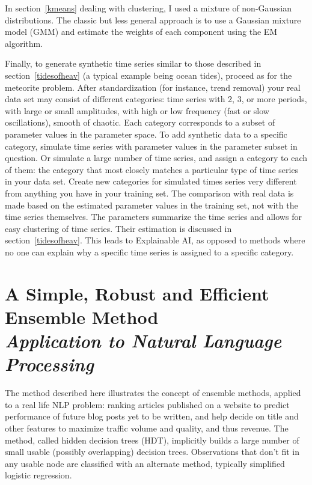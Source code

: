 \documentclass[oneside,10pt]{book}
\newcommand\Chapter[2]{
  \chapter[#1]{#1\\[2ex]\Large\itshape#2}
}
\begin{document}
In section~\ref{kmeans} dealing with clustering, I used a mixture of non-Gaussian distributions. The classic but less general approach is to use a 
\textcolor{index}{Gaussian mixture model} (GMM) and estimate the weights of each component using the \textcolor{index}{EM algorithm}.  

Finally, to generate synthetic time series similar to those described in section~\ref{tidesofheav} (a typical example being ocean tides), proceed as for the meteorite problem. After standardization (for instance, trend removal) your real data set may consist  of different categories: time series with 2, 3, or more periods, with large or small amplitudes, with high or low frequency (fast or slow oscillations), 
 smooth of chaotic. Each category corresponds to a subset of parameter values in the parameter space. To add synthetic data to a specific category, 
 simulate time series with parameter values in the parameter subset in question. Or simulate a large number of time series, and assign a category to each of them: the category that most closely matches a particular type of time series in your data set. Create new categories for simulated times series very different from anything you have in your training set. The comparison with real data is made based on the estimated parameter values in the training set, not with the time series themselves. The parameters summarize the time series and allows for easy clustering of time series. Their estimation is discussed in section~\ref{tidesofheav}. This leads to \textcolor{index}{Explainable AI}, as opposed to methods where no one can explain why a specific time series is assigned to a specific category.  

\Chapter{A Simple, Robust and Efficient Ensemble Method}{Application to Natural Language Processing}\label{piereboul}

The method described here illustrates the concept of \textcolor{index}{ensemble methods}, applied to a real life NLP problem: ranking articles published on a website to 
predict performance of future blog posts yet to be written, and help decide on title and other features to maximize traffic volume and quality, and thus revenue.  
The method, called hidden decision trees (HDT), implicitly builds a large number of small usable (possibly overlapping)  \textcolor{index}{decision trees}. Observations that 
don't fit in any usable node are classified with an alternate method, typically simplified \textcolor{index}{logistic regression}. 
\end{document}
